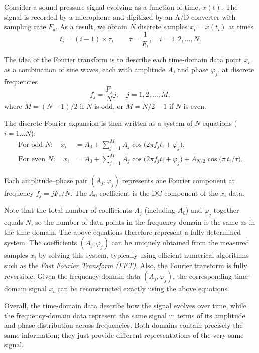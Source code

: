 \documentclass[12pt,a4paper]{article}
\begin{document}
Consider a sound pressure signal evolving as a function of time, $x(t)$. The signal is recorded by a microphone and digitized by an A/D converter with sampling rate \(F_s\). As a result, we obtain $N$ discrete samples $x_i = x(t_i)$ at times
\[
t_i = (i-1) \times \tau, \qquad \tau = \frac{1}{F_s}, \quad i = 1, 2, \ldots, N.
\]

The idea of the Fourier transform is to describe each time-domain data point \(x_i\)
as a combination of sine waves, each with amplitude \(A_j\) and phase \(\varphi_j\),
at discrete frequencies
\[
f_j = \frac{F_s}{N}j, \quad j = 1, 2, \ldots, M,
\]
where \(M = (N - 1)/2\) if \(N\) is odd, or \(M = N/2 - 1\) if \(N\) is even.

The discrete Fourier expansion is then written as a system of $N$ equations ($i = 1\ldots N$):
\begin{align}
\text{For odd } N:\quad
x_i &= A_0 + \sum_{j=1}^{M} A_j \cos\!\big(2\pi f_j t_i + \varphi_j\big), \\[6pt]
\text{For even } N:\quad
x_i &= A_0 + \sum_{j=1}^{M} A_j \cos\!\big(2\pi f_j t_i + \varphi_j\big)
      + A_{N/2}\cos\!\big(\pi\, t_i / \tau\big).
\end{align}

Each amplitude–phase pair \((A_j, \varphi_j)\) represents one Fourier component at frequency \(f_j = jF_s/N\). The $A_0$ coefficient is the DC component of the $x_i$ data.

Note that the total number of coefficients $A_j$ (including $A_0$) and $\varphi_j$ together equals \(N\), so the number of data points in the frequency domain is the same as in the time domain. The above equations therefore represent a fully determined system. The coefficients \((A_j, \varphi_j)\) can be uniquely obtained from the measured samples \(x_i\) by solving this system, typically using efficient numerical algorithms such as the \emph{Fast Fourier Transform (FFT)}. Also, the Fourier transform is fully reversible. Given the frequency-domain data \((A_j, \varphi_j)\), the corresponding time-domain signal \(x_i\) can be reconstructed exactly using the above equations.  

Overall, the time-domain data describe how the signal evolves over time, while the frequency-domain data represent the same signal in terms of its amplitude and phase distribution across frequencies. Both domains contain precisely the same information; they just provide different representations of the very same signal.
\end{document}
